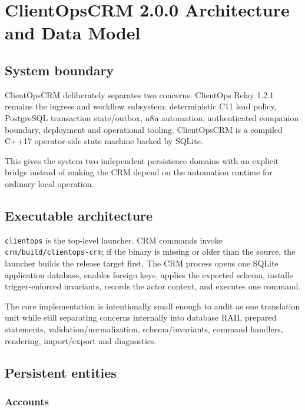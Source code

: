 \documentclass[
]{article}
\author{}
\date{}
\begin{document}
\section{ClientOpsCRM 2.0.0 Architecture and Data
Model}\label{clientopscrm-200-architecture-and-data-model}

\subsection{System boundary}\label{system-boundary}

ClientOpsCRM deliberately separates two concerns. ClientOps Relay 1.2.1
remains the ingress and workflow subsystem: deterministic C11 lead
policy, PostgreSQL transaction state/outbox, n8n automation,
authenticated companion boundary, deployment and operational tooling.
ClientOpsCRM is a compiled C++17 operator-side state machine backed by
SQLite.

This gives the system two independent persistence domains with an
explicit bridge instead of making the CRM depend on the automation
runtime for ordinary local operation.

\subsection{Executable architecture}\label{executable-architecture}

\texttt{clientops} is the top-level launcher. CRM commands invoke
\texttt{crm/build/clientops-crm}; if the binary is missing or older than
the source, the launcher builds the release target first. The CRM
process opens one SQLite application database, enables foreign keys,
applies the expected schema, installs trigger-enforced invariants,
records the actor context, and executes one command.

The core implementation is intentionally small enough to audit as one
translation unit while still separating concerns internally into
database RAII, prepared statements, validation/normalization,
schema/invariants, command handlers, rendering, import/export and
diagnostics.

\subsection{Persistent entities}\label{persistent-entities}

\subsubsection{Accounts}\label{accounts}
\end{document}
